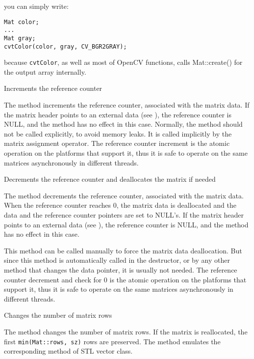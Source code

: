 you can simply write:
\begin{lstlisting}
Mat color;
...
Mat gray;
cvtColor(color, gray, CV_BGR2GRAY);
\end{lstlisting}

because \texttt{cvtColor}, as well as most of OpenCV functions, calls Mat::create() for the output array internally.

Increments the reference counter


The method increments the reference counter, associated with the matrix data. If the matrix header points to an external data (see ), the reference counter is NULL, and the method has no effect in this case. Normally, the method should not be called explicitly, to avoid memory leaks. It is called implicitly by the matrix assignment operator. The reference counter increment is the atomic operation on the platforms that support it, thus it is safe to operate on the same matrices asynchronously in different threads.


Decrements the reference counter and deallocates the matrix if needed


The method decrements the reference counter, associated with the matrix data. When the reference counter reaches 0, the matrix data is deallocated and the data and the reference counter pointers are set to NULL's. If the matrix header points to an external data (see ), the reference counter is NULL, and the method has no effect in this case. 

This method can be called manually to force the matrix data deallocation. But since this method is automatically called in the destructor, or by any other method that changes the data pointer, it is usually not needed. The reference counter decrement and check for 0 is the atomic operation on the platforms that support it, thus it is safe to operate on the same matrices asynchronously in different threads.

Changes the number of matrix rows

\begin{description}
\end{description}

The method changes the number of matrix rows. If the matrix is reallocated, the first \texttt{min(Mat::rows, sz)} rows are preserved. The method emulates the corresponding method of STL vector class.

